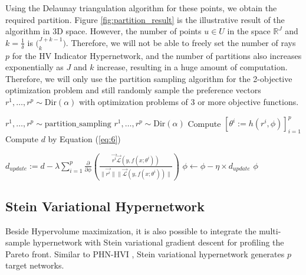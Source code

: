 \documentclass[letterpaper]{article} %
\newcommand{\ourmodel}{PHN-HVI }
\begin{document}
Using the Delaunay triangulation algorithm \cite{Edelsbrunner1985VoronoiDA} for these points, we obtain the required partition. Figure \ref{fig:partition_result} is the illustrative result of the algorithm in 3D space. However, the number of points $u \in U$ in the space $\mathbb{R}^J$ and $k = \frac{1}{\delta}$ is $\Big (^{J+k-1}_k \Big)$. Therefore, we will not be able to freely set the number of rays $p$ for the HV Indicator Hypernetwork, and the number of partitions also increases exponentially as $J$ and $k$ increase, resulting in a huge amount of computation. Therefore, we will only use the partition sampling algorithm for the 2-objective optimization problem and still randomly sample the preference vectors $r^1, \dots, r^p \sim \text{Dir}(\alpha)$ with optimization problems of 3 or more objective functions.

\begin{algorithm}
\caption{\ourmodel optimization algorithm}
\begin{algorithmic}[1]
\STATE $r^1, \dots, r^p \sim \text{partition\_sampling}$
\ELSE
\STATE $r^1, \dots, r^p \sim \text{Dir}(\alpha)$
\ENDIF
\STATE Compute $\left[\theta^{i} := h(r^i, \phi)\right]_{i=1}^p$ \vspace{5pt}
\STATE Compute $d$ by Equation (\ref{eq:6})

\STATE $d_{update} := d - \lambda\sum_{i=1}^p \frac{\partial}{\partial \phi}\left( \frac{\vec{r^i}\vec{\mathcal{L}}(y, f\left(x; \theta^{i} \right))}{\|\vec{r^i}\|\|\vec{\mathcal{L}}(y, f\left(x; \theta^{i} \right))\|}\right) $ 
\STATE $\phi \xleftarrow{} \phi - \eta \times d_{update} $
\ENDWHILE
\RETURN $\phi$
\end{algorithmic}
\label{alg:1}
\end{algorithm}

\subsection{Stein Variational Hypernetwork}
Beside Hypervolume maximization, it is also possible to integrate the multi-sample hypernetwork with Stein variational gradient descent \cite{moosvgd} for profiling the Pareto front. Similar to \ourmodel, Stein variational hypernetwork generates $p$ target networks. 
\end{document}
